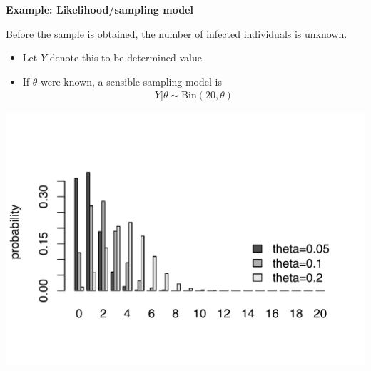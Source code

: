 \documentclass[12pt,xcolor=svgnames]{beamer}
\newcommand{\bl}{\color{blue}}
\newcommand{\theme}{\color{FireBrick}}
\newcommand{\mr}[1]{\mathrm{#1}}
\newcommand{\sk}{\vspace{.4cm}}
\newcommand{\chap}[1]{{\theme \Large \bf #1} \sk}
\begin{document}
\begin{frame}
\chap{Example: Likelihood/sampling model}

Before the sample is obtained, the number of infected individuals is unknown. 
\begin{itemize}
\item Let $Y$ denote this to-be-determined value
\item If $\theta$ were known, a sensible {\bl sampling} model is
\begin{align*}
Y|\theta \sim \mr{Bin} (20, \theta)
\end{align*}
\end{itemize}
\begin{center}
\includegraphics[scale=0.375,trim=20 50 0 100]{bin_sampling}
\end{center}

\end{frame}
\end{document}
